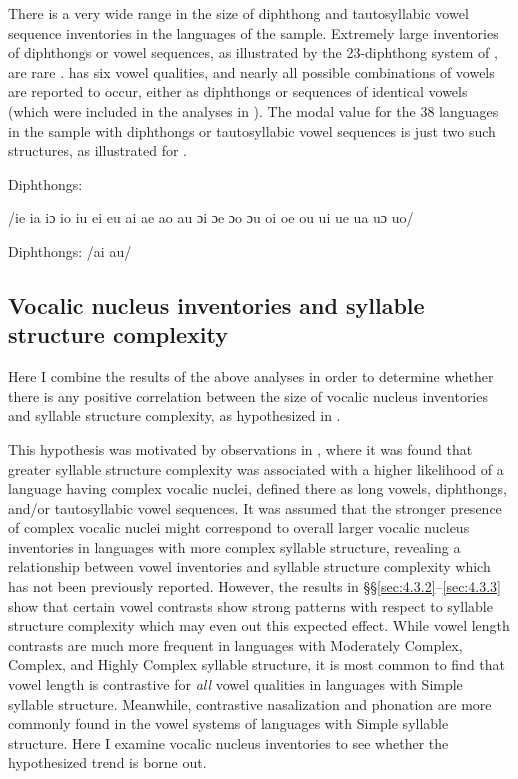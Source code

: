   There is a very wide range in the size of diphthong and tautosyllabic vowel sequence inventories in the languages of the sample. Extremely large inventories of diphthongs or vowel sequences, as illustrated by the 23-diphthong system of , are rare .  has six vowel qualities, and nearly all possible combinations of vowels are reported to occur, either as diphthongs or sequences of identical vowels (which were included in the analyses in ). The modal value for the 38 languages in the sample with diphthongs or tautosyllabic vowel sequences is just two such structures, as illustrated for  .

\ea\label{ex:4.17}
\begin{Coding}
\item[Diphthongs:] \item[] /ie ia iɔ io iu ei eu ai ae ao au ɔi ɔe ɔo ɔu oi oe ou ui ue ua uɔ uo/
\end{Coding}
\z

\ea\label{ex:4.18}
\begin{Coding}
\item[Diphthongs:] /ai au/
\end{Coding}
\z

\subsection{Vocalic nucleus inventories and syllable structure complexity}\label{sec:4.3.5}

  Here I combine the results of the above analyses in order to determine whether there is any positive correlation between the size of vocalic nucleus inventories and syllable structure complexity, as hypothesized in .

  This hypothesis was motivated by observations in , where it was found that greater syllable structure complexity was associated with a higher likelihood of a language having complex vocalic nuclei, defined there as long vowels, diphthongs, and/or tautosyllabic vowel sequences. It was assumed that the stronger presence of complex vocalic nuclei might correspond to overall larger vocalic nucleus inventories in languages with more complex syllable structure, revealing a relationship between vowel inventories and syllable structure complexity which has not been previously reported. However, the results in §§\ref{sec:4.3.2}--\ref{sec:4.3.3} show that certain vowel contrasts show strong patterns with respect to syllable structure complexity which may even out this expected effect. While vowel length contrasts are much more frequent in languages with Moderately Complex, Complex, and Highly Complex syllable structure, it is most common to find that vowel length is contrastive for \textit{all} vowel qualities in languages with Simple syllable structure. Meanwhile, contrastive nasalization and phonation are more commonly found in the vowel systems of languages with Simple syllable structure. Here I examine vocalic nucleus inventories to see whether the hypothesized trend is borne out.

